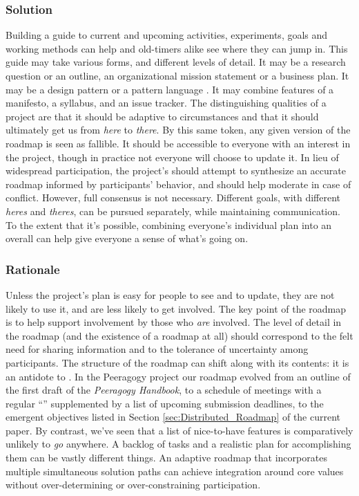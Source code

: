 \subsubsection*{Solution} Building a guide to current and upcoming activities, experiments, goals and working methods can help  and old-timers alike see where they can jump in.  This guide may take various forms, and different levels of detail.  It may be a research question or an outline, an organizational mission statement or a business plan.  It may be a design pattern or a pattern language \cite{kohls2010structure}. It may combine features of a manifesto, a syllabus, and an issue tracker.  The distinguishing qualities of a project  are that it should be adaptive to circumstances and that it should ultimately get us from \emph{here} to \emph{there}.  By this same token, any given version of the roadmap is seen as fallible.  It should be accessible to everyone with an interest in the project, though in practice not everyone will choose to update it.  In lieu of widespread participation, the project's  should attempt to synthesize an accurate roadmap informed by participants' behavior, and should help moderate in case of conflict.  However, full consensus is not necessary.  Different goals, with different \emph{heres} and \emph{theres}, can be pursued separately, while maintaining communication.  To the extent that it's possible, combining everyone's individual plan into an overall  can help give everyone a sense of what's going on.

\subsubsection*{Rationale} Unless the project's plan is easy for people to see and to update, they are not likely to use it, and are less likely to get involved.  The key point of the roadmap is to help support involvement by those who \emph{are} involved.   The level of detail in the roadmap (and the existence of a roadmap at all) should correspond to the felt need for sharing information and to the tolerance of uncertainty among participants.
The structure of the roadmap can shift along with its contents: it is an antidote to  \cite[pp. 121--124]{david2001software}. 
In the Peeragogy project our roadmap evolved from an outline of the first draft of the
\emph{Peeragogy Handbook}, to a schedule of meetings with a regular
``'' supplemented by a list of upcoming submission deadlines, to the emergent objectives listed in Section \ref{sec:Distributed_Roadmap} of the current paper.
By contrast, we've seen that a list of nice-to-have features is comparatively
unlikely to \emph{go} anywhere.  A backlog of tasks and a realistic
plan for accomplishing them can be vastly different things.
%
An adaptive roadmap that incorporates multiple simultaneous solution paths
can achieve integration around core values without over-determining or
over-constraining participation. 

